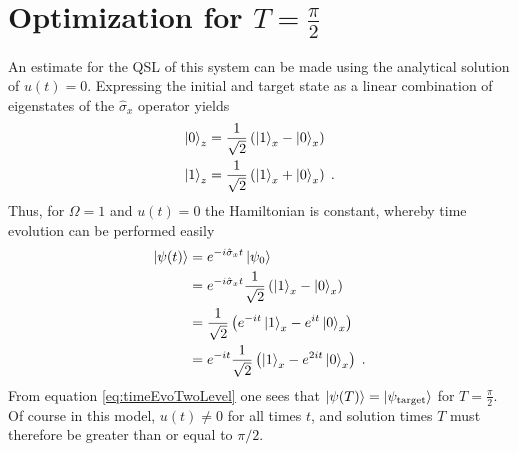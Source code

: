 \section{Optimization for $T = \frac{\pi}{2}$ } 
An estimate for the QSL of this system can be made using the analytical solution of $u(t) = 0$. Expressing the initial and target state as a linear combination of eigenstates of the $\hat{\sigma}_x$ operator yields
\begin{align}
	\ket{0}_z &= \frac{1}{\sqrt{2}} \left( \ket{1}_x - \ket{0}_x \right) \\ 
	\ket{1}_z &= \frac{1}{\sqrt{2}} \left( \ket{1}_x + \ket{0}_x \right) \; .
\end{align}
Thus, for $\Omega = 1$ and $u(t) = 0$ the Hamiltonian is constant, whereby time evolution can be performed easily
\begin{align}
	\ket{\psi (t)} &= e^{-i \hat{\sigma}_x t} \ket{\psi _0} \nonumber \\
	&= e^{-i \hat{\sigma}_x t } \frac{1}{\sqrt{2}} \left( \ket{1}_x - \ket{0}_x \right) \nonumber \\
	&= \frac{1}{\sqrt{2}} \left( e^{-i t} \ket{1}_x - e^{i t} \ket{0}_x \right) \nonumber \\
	&= e^{-i t} \frac{1}{\sqrt{2}} \left( \ket{1}_x - e^{2 i t} \ket{0}_x \right) \; . \label{eq:timeEvoTwoLevel}
\end{align}
From equation \ref{eq:timeEvoTwoLevel} one sees that $\ket{\psi (T)} = \ket{\psi _{\mathrm{target}}}$ for $T = \frac{\pi}{2}$. Of course in this model, $u(t) \neq 0$ for all times $t$, and solution times $T$ must therefore be greater than or equal to $\pi/2$.

